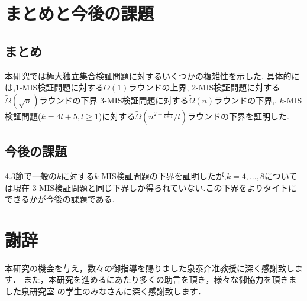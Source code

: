 \documentclass[12pt]{thesis}
\theoremstyle{definition}
\begin{document}
\chapter{まとめと今後の課題}
\section{まとめ}
本研究では極大独立集合検証問題に対するいくつかの複雑性を示した.
具体的には,1-MIS検証問題に対する$O(1)$ラウンドの上界,
2-MIS検証問題に対する$\tilde{\Omega} (\sqrt{n})$ラウンドの下界
3-MIS検証問題に対する$\tilde{\Omega} (n)$ラウンドの下界,.
$k$-MIS検証問題($k = 4l + 5, l \geq 1$)に対する$\tilde{\Omega}\left(n^{2 - \frac{1}{l + 1}}/l\right)$ラウンドの下界を証明した.

\section{今後の課題}
4.3節で一般の$k$に対する$k$-MIS検証問題の下界を証明したが,$k = 4,...,8$については現在
3-MIS検証問題と同じ下界しか得られていない.この下界をよりタイトにできるかが今後の課題である.
\newpage

\chapter*{謝辞}
本研究の機会を与え，数々の御指導を賜りました泉泰介准教授に深く感謝致します．
また，本研究を進めるにあたり多くの助言を頂き，様々な御協力を頂きました泉研究室
の学生のみなさんに深く感謝致します．

\newpage


\end{document}
